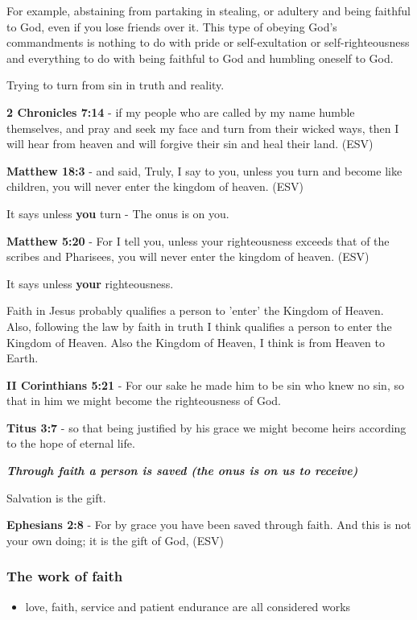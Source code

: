 \documentclass[11pt]{article}
\begin{document}
For example, abstaining from partaking in stealing, or adultery and being faithful to God, even if you lose friends over it.
This type of obeying God's commandments is nothing to do with pride or self-exultation or self-righteousness and everything to do with being faithful to God and humbling oneself to God.

Trying to turn from sin in truth and reality.

\textbf{2 Chronicles 7:14} - if my people who are called by my name humble themselves, and pray and seek my face and turn from their wicked ways, then I will hear from heaven and will forgive their sin and heal their land. (ESV)

\textbf{Matthew 18:3} - and said, Truly, I say to you, unless you turn and become like children, you will never enter the kingdom of heaven. (ESV)

It says unless \textbf{you} turn - The onus is on you.

\textbf{Matthew 5:20} - For I tell you, unless your righteousness exceeds that of the scribes and Pharisees, you will never enter the kingdom of heaven. (ESV)

It says unless \textbf{your} righteousness.

Faith in Jesus probably qualifies a person to 'enter' the Kingdom of Heaven.
Also, following the law by faith in truth I think qualifies a person to enter the Kingdom of Heaven.
Also the Kingdom of Heaven, I think is from Heaven to Earth.

\textbf{II Corinthians 5:21} - For our sake he made him to be sin who knew no sin, so that in him we might become the righteousness of God.

\textbf{Titus 3:7} - so that being justified by his grace we might become heirs according to the hope of eternal life.

\emph{\textbf{Through faith a person is saved (the onus is on us to receive)}}

Salvation is the gift.

\textbf{Ephesians 2:8} - For by grace you have been saved through faith. And this is not your own doing; it is the gift of God, (ESV)

\subsubsection{The work of faith}
\label{sec:org361c1a9}
\begin{itemize}
\item love, faith, service and patient endurance are all considered works
\end{itemize}
\end{document}
